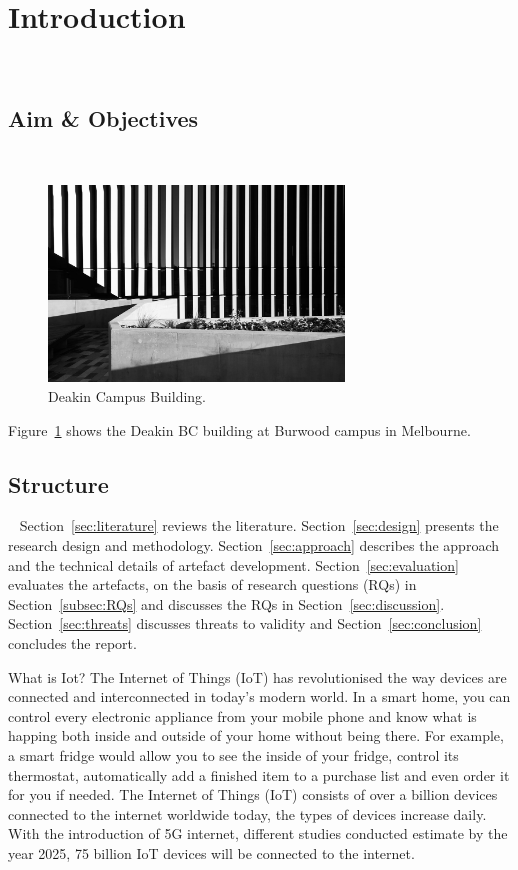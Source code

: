 \section{Introduction}~\label{sec:introduction}
\subsection{Aim \& Objectives}~\label{subsec:aims}

\begin{figure}[h]
    \centering
    \includegraphics[width=0.7\textwidth]{Deakin_img.jpg}
    \caption{Deakin Campus Building.}
    \label{fig:building}
\end{figure}

Figure~\ref{fig:building} shows the Deakin BC building at Burwood campus in Melbourne.

\subsection{Structure}~\label{subsec:structure}
Section~\ref{sec:literature} reviews the literature. Section~\ref{sec:design} presents the research design and methodology. Section~\ref{sec:approach} describes the approach and the technical details of artefact development. Section~\ref{sec:evaluation} evaluates the artefacts, on the basis of research questions (RQs) in Section~\ref{subsec:RQs} and discusses the RQs in Section~\ref{sec:discussion}. Section~\ref{sec:threats} discusses threats to validity and Section~\ref{sec:conclusion} concludes the report. 

What is Iot?
The Internet of Things (IoT) has revolutionised the way devices are connected and interconnected in today's modern world. In a smart home, you can control every electronic appliance from your mobile phone and know what is happing both inside and outside of your home without being there. For example, a smart fridge would allow you to see the inside of your fridge, control its thermostat, automatically add a finished item to a purchase list and even order it for you if needed. The Internet of Things (IoT) consists of over a billion devices connected to the internet worldwide today, the types of devices increase daily. With the introduction of 5G internet, different studies conducted estimate by the year 2025, 75 billion IoT devices will be connected to the internet.

